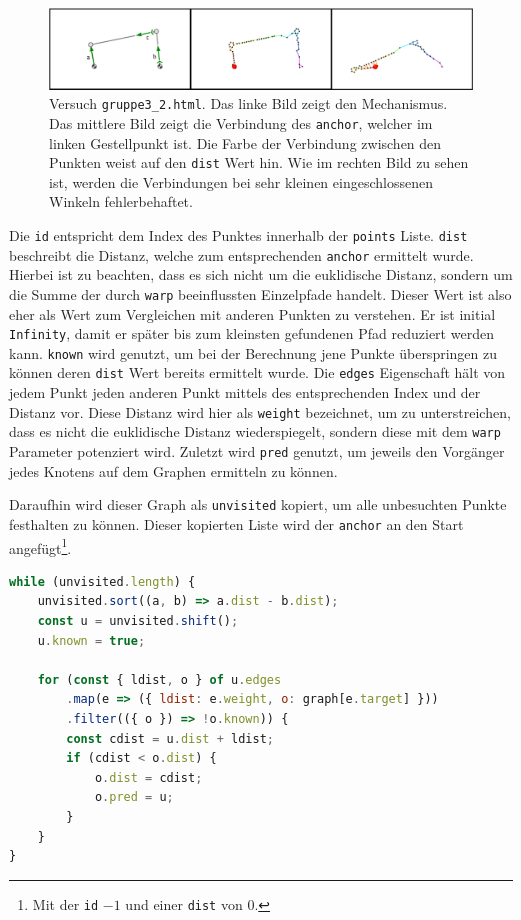 \begin{figure}
    \centering
    \includegraphics[width=\textwidth]{gfx/dijkstra_edit.png}
    \caption[Versuch \lstinline{gruppe3_2.html}]{Versuch \lstinline{gruppe3_2.html}. Das linke Bild zeigt den Mechanismus. Das mittlere Bild zeigt die Verbindung des \lstinline{anchor}, welcher im linken Gestellpunkt ist. Die Farbe der Verbindung zwischen den Punkten weist auf den \lstinline{dist} Wert hin.
    Wie im rechten Bild zu sehen ist, werden die Verbindungen bei sehr kleinen eingeschlossenen Winkeln fehlerbehaftet.}
    \label{fig:gruppe3_1}
\end{figure}

Die \lstinline{id} entspricht dem Index des Punktes innerhalb der \lstinline{points} Liste.
\lstinline{dist} beschreibt die Distanz, welche zum entsprechenden \lstinline{anchor} ermittelt wurde.
Hierbei ist zu beachten, dass es sich nicht um die euklidische Distanz, sondern um die Summe der durch \lstinline{warp} beeinflussten Einzelpfade handelt.
Dieser Wert ist also eher als Wert zum Vergleichen mit anderen Punkten zu verstehen.
Er ist initial \lstinline{Infinity}, damit er später bis zum kleinsten gefundenen Pfad reduziert werden kann.
\lstinline{known} wird genutzt, um bei der Berechnung jene Punkte überspringen zu können deren \lstinline{dist} Wert bereits ermittelt wurde.
Die \lstinline{edges} Eigenschaft hält von jedem Punkt jeden anderen Punkt mittels des entsprechenden Index und der Distanz vor.
Diese Distanz wird hier als \lstinline{weight} bezeichnet, um zu unterstreichen, dass es nicht die euklidische Distanz wiederspiegelt, sondern diese mit dem \lstinline{warp} Parameter potenziert wird.
Zuletzt wird \lstinline{pred} genutzt, um jeweils den Vorgänger jedes Knotens auf dem Graphen ermitteln zu können.

Daraufhin wird dieser Graph als \lstinline{unvisited} kopiert, um alle unbesuchten Punkte festhalten zu können.
Dieser kopierten Liste wird der \lstinline{anchor} an den Start angefügt\footnote{Mit der \lstinline{id} $-1$ und einer \lstinline{dist} von 0.}.

\begin{lstlisting}[language=JavaScript, caption={Berechnung der \lstinline{dist} Eigenschaft der einzelnen Objekte aus dem Dijkstra-Graphen.}, label={lst:creation_dijkstra_graph}]
while (unvisited.length) {
    unvisited.sort((a, b) => a.dist - b.dist);
    const u = unvisited.shift();
    u.known = true;

    for (const { ldist, o } of u.edges
        .map(e => ({ ldist: e.weight, o: graph[e.target] }))
        .filter(({ o }) => !o.known)) {
        const cdist = u.dist + ldist;
        if (cdist < o.dist) {
            o.dist = cdist;
            o.pred = u;
        }
    }
}
\end{lstlisting}


